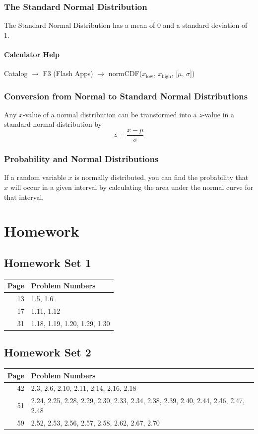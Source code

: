 \documentclass{book}
\begin{document}
\subsection{The Standard Normal Distribution}
The Standard Normal Distribution has a mean of 0 and a standard deviation of 1.

\subsubsection{Calculator Help}
Catalog $\rightarrow$ F3 (Flash Apps) $\rightarrow$ normCDF($x_\text{low}$, $x_\text{high}$, [$\mu$, $\sigma$])

\subsection{Conversion from Normal to Standard Normal Distributions}

Any $x$-value of a normal distribution can be transformed into a $z$-value in a standard normal distribution by
$$z=\frac{x-\mu}{\sigma}$$

\subsection{Probability and Normal Distributions}

If a random variable $x$ is normally distributed, you can find the probability that $x$ will occur in a given interval by calculating the area under the normal curve for that interval.

\appendix
\chapter{Homework}
\section{Homework Set 1}
\begin{tabular}{r|l}
Page & Problem Numbers\\
\hline
13 & 1.5, 1.6\\
17 & 1.11, 1.12\\
31 & 1.18, 1.19, 1.20, 1.29, 1.30\\
\end{tabular}

\section{Homework Set 2}
\begin{tabular}{r|l}
Page & Problem Numbers\\
\hline
42 & 2.3, 2.6, 2.10, 2.11, 2.14, 2.16, 2.18\\
51 & 2.24, 2.25, 2.28, 2.29, 2.30, 2.33, 2.34, 2.38, 2.39, 2.40, 2.44, 2.46, 2.47, 2.48\\
59 & 2.52, 2.53, 2.56, 2.57, 2.58, 2.62, 2.67, 2.70\\
\end{tabular}
\end{document}
